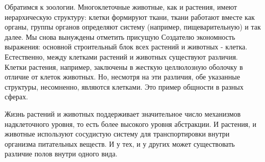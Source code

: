 \documentclass[11pt]{article}
\begin{document}
Обратимся к зоологии. Многоклеточные животные, как и растения, имеют иерархическую структуру: клетки формируют ткани, ткани работают вместе как органы, группы органов определяют систему (например, пищеварительную) и так далее. Мы снова вынуждены отметить присущую Создателю экономность выражения: основной строительный блок всех растений и животных - клетка. Естественно, между клетками растений и животных существуют различия. Клетки растения, например, заключены в жесткую целлюлозную оболочку в отличие от клеток животных. Но, несмотря на эти различия, обе указанные структуры, несомненно, являются клетками. Это пример общности в разных сферах. \par
Жизнь растений и животных поддерживает значительное число механизмов надклеточного уровня, то есть более высокого уровня абстракции. И растения, и животные используют сосудистую систему для транспортировки внутри организма питательных веществ. И у тех, и у других может существовать различие полов внутри одного вида.
\end{document}
